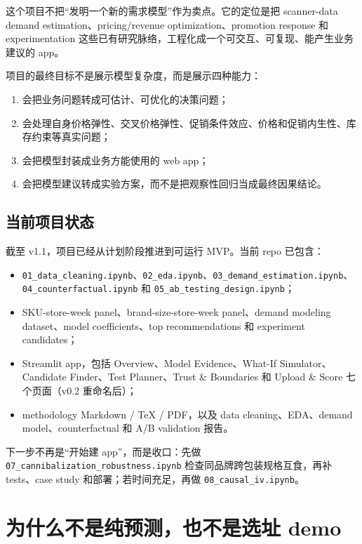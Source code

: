 \documentclass[UTF8,11pt,a4paper,fontset=none]{ctexart}
\begin{document}
这个项目不把“发明一个新的需求模型”作为卖点。它的定位是把 scanner-data demand estimation、pricing/revenue optimization、promotion response 和 experimentation 这些已有研究脉络，工程化成一个可交互、可复现、能产生业务建议的 app。

项目的最终目标不是展示模型复杂度，而是展示四种能力：
\begin{enumerate}
  \item 会把业务问题转成可估计、可优化的决策问题；
  \item 会处理自身价格弹性、交叉价格弹性、促销条件效应、价格和促销内生性、库存约束等真实问题；
  \item 会把模型封装成业务方能使用的 web app；
  \item 会把模型建议转成实验方案，而不是把观察性回归当成最终因果结论。
\end{enumerate}

\subsection{当前项目状态}

截至 v1.1，项目已经从计划阶段推进到可运行 MVP。当前 repo 已包含：

\begin{itemize}
  \item \texttt{01\_data\_cleaning.ipynb}、\texttt{02\_eda.ipynb}、\texttt{03\_demand\_estimation.ipynb}、\texttt{04\_counterfactual.ipynb} 和 \texttt{05\_ab\_testing\_design.ipynb}；
  \item SKU-store-week panel、brand-size-store-week panel、demand modeling dataset、model coefficients、top recommendations 和 experiment candidates；
  \item Streamlit app，包括 Overview、Model Evidence、What-If Simulator、Candidate Finder、Test Planner、Trust \& Boundaries 和 Upload \& Score 七个页面（v0.2 重命名后）；
  \item methodology Markdown / TeX / PDF，以及 data cleaning、EDA、demand model、counterfactual 和 A/B validation 报告。
\end{itemize}

下一步不再是“开始建 app”，而是收口：先做 \texttt{07\_cannibalization\_robustness.ipynb} 检查同品牌跨包装规格互食，再补 tests、case study 和部署；若时间充足，再做 \texttt{08\_causal\_iv.ipynb}。

\section{为什么不是纯预测，也不是选址 demo}
\end{document}
